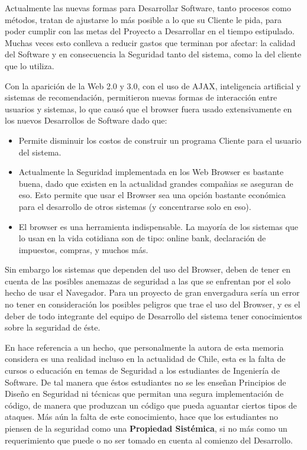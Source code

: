 Actualmente las nuevas formas para Desarrollar Software, tanto procesos como métodos, tratan de ajustarse lo más posible a lo que su Cliente le pida, para poder cumplir con las metas del Proyecto a Desarrollar en el tiempo estipulado. Muchas veces esto conlleva a reducir gastos que terminan por afectar: la calidad del Software y en consecuencia la Seguridad tanto del sistema, como la del cliente que lo utiliza.

Con la aparición de la Web 2.0 y 3.0, con el uso de AJAX, inteligencia artificial y sistemas de recomendación, permitieron nuevas formas de interacción entre usuarios y sistemas, lo que causó que el browser fuera usado extensivamente en los nuevos Desarrollos de Software dado que:
\begin{itemize}
	\item Permite disminuir los costos de construir un programa Cliente para el usuario del sistema.
	\item Actualmente la Seguridad implementada en los Web Browser es bastante buena, dado que existen en la actualidad grandes compañias se aseguran de eso. Esto permite que usar el Browser sea una opción bastante económica para el desarrollo de otros sistemas (y concentrarse solo en eso).
	\item El browser es una herramienta indispensable. La mayoría de los sistemas que lo usan en la vida cotidiana son de tipo: online bank, declaración de impuestos, compras, y muchos más.
\end{itemize}

Sin embargo los sistemas que dependen del uso del Browser, deben de tener en cuenta de las posibles anemazas de seguridad a las que se enfrentan por el solo hecho de usar el Navegador.  Para un proyecto de gran envergadura sería un error no tener en consideración los posibles peligros que trae el uso del Browser, y es el deber de todo integrante del equipo de Desarrollo del sistema tener conocimientos sobre la seguridad de éste.

En \cite{goertzel2007software} hace referencia a un hecho, que personalmente la autora de esta memoria considera es una realidad incluso en la actualidad de Chile, esta es la falta de cursos o educación en temas de Seguridad a los estudiantes de Ingeniería de Software. De tal manera que éstos estudiantes no se les enseñan Principios de Diseño en Seguridad ni técnicas que permitan una segura implementación de código, de manera que produzcan un código que pueda aguantar ciertos tipos de ataques. Más aún la falta de este conocimiento, hace que los estudiantes no piensen de la seguridad como una \textbf{Propiedad Sistémica}, si no más como un requerimiento que puede o no ser tomado en cuenta al comienzo del Desarrollo.

